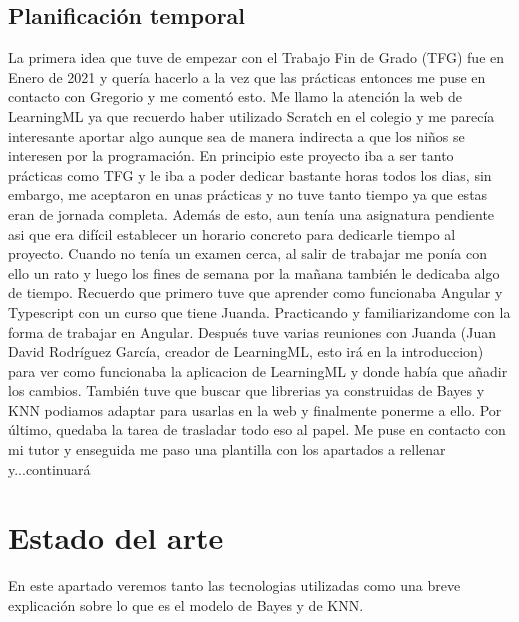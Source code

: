 \documentclass[a4paper, 12pt]{book}
\begin{document}
\section{Planificación temporal}
\label{sec:planificacion-temporal}

La primera idea que tuve de empezar con el Trabajo Fin de Grado (TFG) fue en Enero de 2021 y quería hacerlo a la vez que las prácticas entonces me puse en contacto con Gregorio y me comentó esto. Me llamo la atención la web de LearningML ya que recuerdo haber utilizado Scratch en el colegio y me parecía interesante aportar algo aunque sea de manera indirecta a que los niños se interesen por la programación.
En principio este proyecto iba a ser tanto prácticas como TFG y le iba a poder dedicar bastante horas todos los dias, sin embargo, me aceptaron en unas prácticas y no tuve tanto tiempo ya que estas eran de jornada completa. Además de esto, aun tenía una asignatura pendiente asi que era difícil establecer un horario concreto para dedicarle tiempo al proyecto. Cuando no tenía un examen cerca, al salir de trabajar me ponía con ello un rato y luego los fines de semana por la mañana también le dedicaba algo de tiempo. 
Recuerdo que primero tuve que aprender como funcionaba Angular y Typescript con un curso que tiene Juanda. Practicando y familiarizandome con la forma de trabajar en Angular.
Después tuve varias reuniones con Juanda (Juan David Rodríguez García, creador de LearningML, esto irá en la introduccion) para ver como funcionaba la aplicacion de LearningML y donde había que añadir los cambios.
También tuve que buscar que librerias ya construidas de Bayes y KNN podiamos adaptar para usarlas en la web y finalmente ponerme a ello.
Por último, quedaba la tarea de trasladar todo eso al papel. Me puse en contacto con mi tutor y enseguida me paso una plantilla con los apartados a rellenar y...continuará



\cleardoublepage
\chapter{Estado del arte}
\label{chap:estado}

En este apartado veremos tanto las tecnologias utilizadas como una breve explicación sobre lo que es el modelo de Bayes y de KNN.
\end{document}
